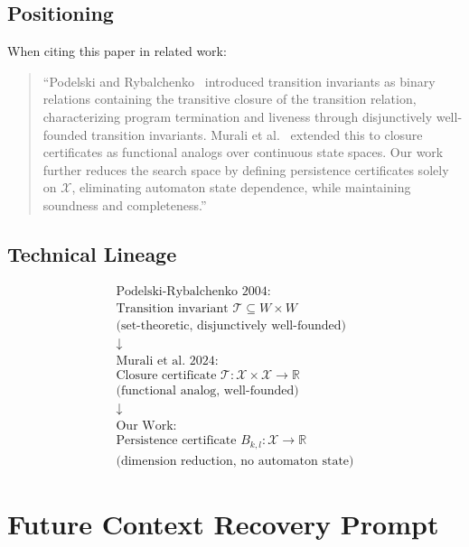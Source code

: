 \documentclass{article}
\begin{document}
\subsection{Positioning}

When citing this paper in related work:

\begin{quote}
``Podelski and Rybalchenko~\cite{podelski2004transition} introduced transition invariants as binary relations containing the transitive closure of the transition relation, characterizing program termination and liveness through disjunctively well-founded transition invariants. Murali et al.~\cite{murali2024closure} extended this to closure certificates as functional analogs over continuous state spaces. Our work further reduces the search space by defining persistence certificates solely on $\mathcal{X}$, eliminating automaton state dependence, while maintaining soundness and completeness.''
\end{quote}

\subsection{Technical Lineage}

\begin{equation}
\begin{array}{c}
\text{Podelski-Rybalchenko 2004:} \\
\text{Transition invariant } \mathcal{T} \subseteq W \times W \\
\text{(set-theoretic, disjunctively well-founded)}\\
\downarrow\\
\text{Murali et al. 2024:}\\
\text{Closure certificate } \mathcal{T}: \mathcal{X} \times \mathcal{X} \to \mathbb{R}\\
\text{(functional analog, well-founded)}\\
\downarrow\\
\text{Our Work:}\\
\text{Persistence certificate } B_{k,l}: \mathcal{X} \to \mathbb{R}\\
\text{(dimension reduction, no automaton state)}
\end{array}
\end{equation}

\section{Future Context Recovery Prompt}
\end{document}
